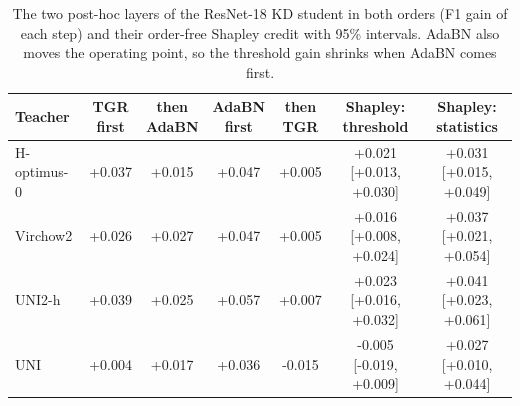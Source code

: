\begin{table}[htbp]
{\caption{The two post-hoc layers of the ResNet-18 KD student in both orders (F1 gain of each step) and their order-free Shapley credit with 95\% intervals. AdaBN also moves the operating point, so the threshold gain shrinks when AdaBN comes first.}}
{%
\scriptsize
\setlength{\tabcolsep}{3pt}
\begin{tabular}{@{}lcccccc@{}}
\toprule
Teacher & \makecell{TGR\\first} & \makecell{then\\AdaBN} & \makecell{AdaBN\\first} & \makecell{then\\TGR} & Shapley: threshold & Shapley: statistics \\
\midrule
H-optimus-0 & +0.037 & +0.015 & +0.047 & +0.005 & +0.021 [+0.013, +0.030] & +0.031 [+0.015, +0.049] \\
Virchow2 & +0.026 & +0.027 & +0.047 & +0.005 & +0.016 [+0.008, +0.024] & +0.037 [+0.021, +0.054] \\
UNI2-h & +0.039 & +0.025 & +0.057 & +0.007 & +0.023 [+0.016, +0.032] & +0.041 [+0.023, +0.061] \\
UNI & +0.004 & +0.017 & +0.036 & -0.015 & -0.005 [-0.019, +0.009] & +0.027 [+0.010, +0.044] \\
\bottomrule
\end{tabular}
}
\end{table}
